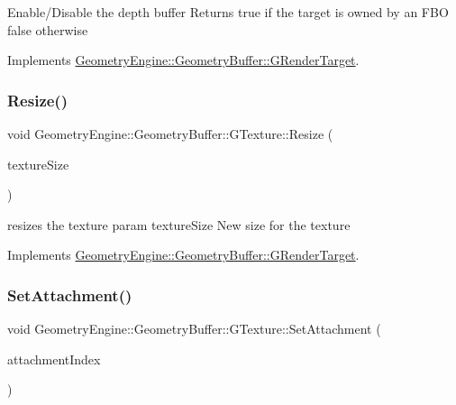 Enable/\+Disable the depth buffer Returns true if the target is owned by an F\+BO false otherwise 

Implements \mbox{\hyperlink{class_geometry_engine_1_1_geometry_buffer_1_1_g_render_target_a1b8be750dfd13582d0730bf9e4c4e1d2}{Geometry\+Engine\+::\+Geometry\+Buffer\+::\+G\+Render\+Target}}.

\mbox{\label{class_geometry_engine_1_1_geometry_buffer_1_1_g_texture_a17c5c626b214d8d0bfb9988b52376a55}} 
\subsubsection{\texorpdfstring{Resize()}{Resize()}}
{\footnotesize\ttfamily void Geometry\+Engine\+::\+Geometry\+Buffer\+::\+G\+Texture\+::\+Resize (\begin{DoxyParamCaption}\item[{const Q\+Vector2D \&}]{texture\+Size }\end{DoxyParamCaption})\hspace{0.3cm}{\ttfamily [virtual]}}

resizes the texture param texture\+Size New size for the texture 

Implements \mbox{\hyperlink{class_geometry_engine_1_1_geometry_buffer_1_1_g_render_target_ac1e54f456408b53de44fe10116d649dd}{Geometry\+Engine\+::\+Geometry\+Buffer\+::\+G\+Render\+Target}}.

\mbox{\label{class_geometry_engine_1_1_geometry_buffer_1_1_g_texture_a30c0e98fd265c6f47fe7df0ad4f39644}} 
\subsubsection{\texorpdfstring{SetAttachment()}{SetAttachment()}\hspace{0.1cm}{\footnotesize\ttfamily [1/2]}}
{\footnotesize\ttfamily void Geometry\+Engine\+::\+Geometry\+Buffer\+::\+G\+Texture\+::\+Set\+Attachment (\begin{DoxyParamCaption}\item[{unsigned int}]{attachment\+Index }\end{DoxyParamCaption})\hspace{0.3cm}{\ttfamily [virtual]}}

